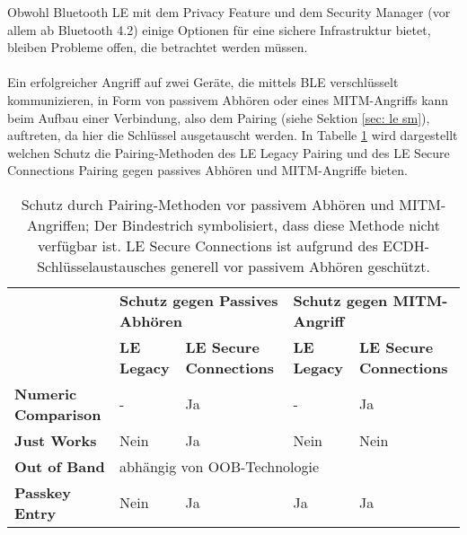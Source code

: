 Obwohl Bluetooth LE mit dem Privacy Feature und dem Security Manager (vor allem ab Bluetooth 4.2) einige Optionen für eine sichere Infrastruktur bietet, bleiben Probleme offen, die betrachtet werden müssen.
\\\\
Ein erfolgreicher Angriff auf zwei Geräte, die mittels BLE verschlüsselt kommunizieren, in Form von passivem Abhören oder eines MITM-Angriffs kann beim Aufbau einer Verbindung, also dem Pairing (siehe Sektion \ref{sec: le sm}), auftreten, da hier die Schlüssel ausgetauscht werden. In Tabelle \ref{tab: le sicherheit zusammenfassung}
wird dargestellt welchen Schutz die Pairing-Methoden des LE Legacy Pairing und des LE Secure Connections Pairing gegen passives Abhören und MITM-Angriffe bieten.

\begin{table}
    \begin{tabularx}{\textwidth}{|p{2.8cm}|p{2cm}|p{3cm}|p{2cm}|p{3cm}|}
        \hline
        & \multicolumn{2}{X|}{\textbf{Schutz gegen Passives Abhören}} & \multicolumn{2}{X|}{\textbf{Schutz gegen MITM-Angriff}} \\
        & \textbf{LE Legacy} & \textbf{LE Secure Connections} & \textbf{LE Legacy} & \textbf{LE Secure Connections} \\
        \hline
        \textbf{Numeric Comparison} & - & Ja & - & Ja \cite{BtSpec4.2_2309} \\
        \hline
        \textbf{Just Works} & Nein \cite{BtSpec4.2_2304_b} & Ja \cite{BtSpec4.2_245} & Nein \cite{BtSpec4.2_2304_b} & Nein \cite{BtSpec4.2_245} \\
        \hline
        \textbf{Out of Band} & \multicolumn{4}{|l|}{abhängig von OOB-Technologie \cite{BtSpec4.2_2305} \cite{BtSpec4.2_2312-2313}} \\
        \hline
        \textbf{Passkey Entry} & Nein \cite{BtSpec4.2_2304} & Ja & Ja \cite{BtSpec4.2_2304} & Ja \cite{BtSpec4.2_2311}\\
        \hline
    \end{tabularx}
    \caption[Schutz durch Pairing-Methoden vor passivem Abhören und MITM]{Schutz durch Pairing-Methoden vor passivem Abhören und MITM-Angriffen; Der Bindestrich symbolisiert, dass diese Methode nicht verfügbar ist. LE Secure Connections ist aufgrund des ECDH-Schlüsselaustausches \cite{BtSpec4.2_2307} generell vor passivem Abhören geschützt.}
    \label{tab: le sicherheit zusammenfassung}
\end{table}

